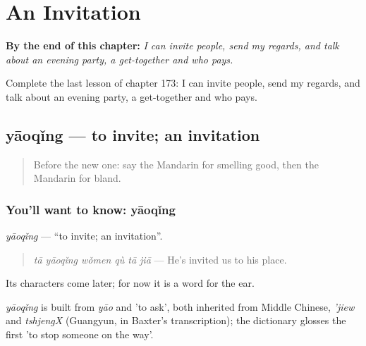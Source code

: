 
\chapter{An Invitation}
\label{ch:zh-an-invitation}

\begin{chapteropening}
\textbf{By the end of this chapter:} \emph{I can invite people, send my regards, and talk about an evening party, a get-together and who pays.}

Complete the last lesson of chapter 173: I can invite people, send my regards, and talk about an evening party, a get-together and who pays.
\end{chapteropening}

\section[yāoqǐng]{yāoqǐng — to invite; an invitation}

\label{lesson:ZH-C173-yaoqing}



\begin{quote}
Before the new one: say the Mandarin for smelling good, then the Mandarin for bland.
\end{quote}

\subsection*{You'll want to know: yāoqǐng}
\emph{yāoqǐng} — \textquotedblleft{}to invite; an invitation\textquotedblright{}.

\begin{quote}
\emph{tā yāoqǐng wǒmen qù tā jiā} — He's invited us to his place.
\end{quote}

Its characters come later; for now it is a word for the ear.

\begin{cousinweb}
\emph{yāoqǐng} is built from \emph{yāo} and  'to ask', both inherited from Middle Chinese, \emph{'jiew} and \emph{tshjengX} (Guangyun, in Baxter's transcription); the dictionary glosses the first 'to stop someone on the way'.
\end{cousinweb}

